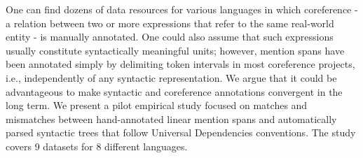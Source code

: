 One can find dozens of data resources for various languages in which coreference - a relation between two or more expressions that refer to the same real-world entity - is manually annotated. One could also assume that such expressions usually constitute syntactically meaningful units; however, mention spans have been annotated simply by delimiting token intervals in most coreference projects, i.e., independently of any syntactic representation. We argue that it could be advantageous to make syntactic and coreference annotations convergent in the long term. We present a pilot empirical study focused on matches and mismatches between hand-annotated linear mention spans and automatically parsed syntactic trees that follow Universal Dependencies conventions. The study covers 9 datasets for 8 different languages.
